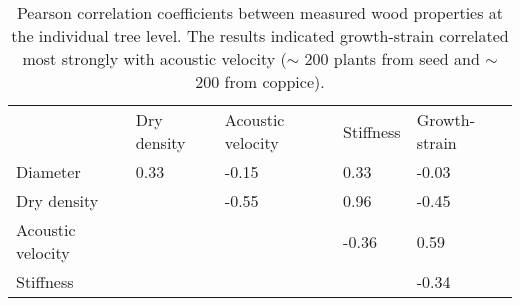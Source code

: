 \begin{table}
\centering
\caption{Pearson correlation coefficients between measured wood properties at the individual tree level. The results indicated growth-strain correlated most strongly with acoustic velocity (\(\sim\) 200 plants from seed and \(\sim\) 200 from coppice). }
\begin{tabular}{lllll}
                  & Dry density & Acoustic velocity & Stiffness & Growth-strain \\
Diameter          & 0.33        & -0.15             & 0.33      & -0.03         \\
Dry density       &             & -0.55             & 0.96      & -0.45         \\
Acoustic velocity &             &                   & -0.36     & 0.59          \\
Stiffness         &             &                   &           & -0.34        
\end{tabular}
\end{table}